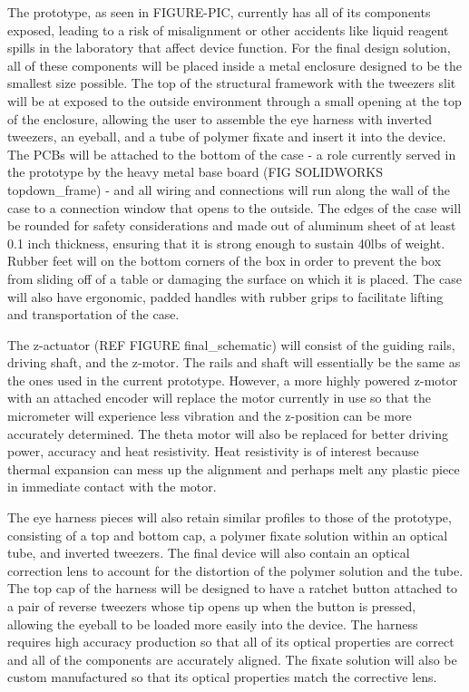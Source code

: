 \documentclass{article}
\begin{document}
The prototype, as seen in FIGURE-PIC, currently has all of its components exposed, leading to a risk of misalignment or other accidents like liquid reagent spills in the laboratory that affect device function.  For the final design solution, all of these components will be placed inside a metal enclosure designed to be the smallest size possible. The top of the structural framework with the tweezers slit will be at exposed to the outside environment through a small opening at the top of the enclosure, allowing the user to assemble the eye harness with inverted tweezers, an eyeball, and a tube of polymer fixate and insert it into the device. The PCBs will be attached to the bottom of the case - a role currently served in the prototype by the heavy metal base board (FIG SOLIDWORKS topdown_frame) -  and all wiring and connections will run along the wall of the case to a connection window that opens to the outside. The edges of the case will be rounded for safety considerations and made out of aluminum sheet of at least 0.1 inch thickness, ensuring that it is strong enough to sustain 40lbs of weight. Rubber feet will on the bottom corners of the box in order to prevent the box from sliding off of a table or damaging the surface on which it is placed. The case will also have ergonomic, padded handles with rubber grips to facilitate lifting and transportation of the case.  

The z-actuator (REF FIGURE final_schematic) will consist of the guiding rails, driving shaft, and the z-motor. The rails and shaft will essentially be the same as the ones used in the current prototype. However, a more highly powered z-motor with an attached encoder will replace the motor currently in use so that the micrometer will experience less vibration and the z-position can be more accurately determined. The theta motor will also be replaced for better driving power, accuracy and heat resistivity. Heat resistivity is of interest because thermal expansion can mess up the alignment and perhaps melt any plastic piece in immediate contact with the motor.

The eye harness pieces will also retain similar profiles to those of the prototype, consisting of a top and bottom cap, a polymer fixate solution within an optical tube, and inverted tweezers.  The final device will also contain an optical correction lens to account for the distortion of the polymer solution and the tube. The top cap of the harness will be designed to have a ratchet button attached to a pair of reverse tweezers whose tip opens up when the button is pressed, allowing the eyeball to be loaded more easily into the device. The harness requires high accuracy production so that all of its optical properties are correct and all of the components are accurately aligned. The fixate solution will also be custom manufactured so that its optical properties match the corrective lens.
\end{document}
